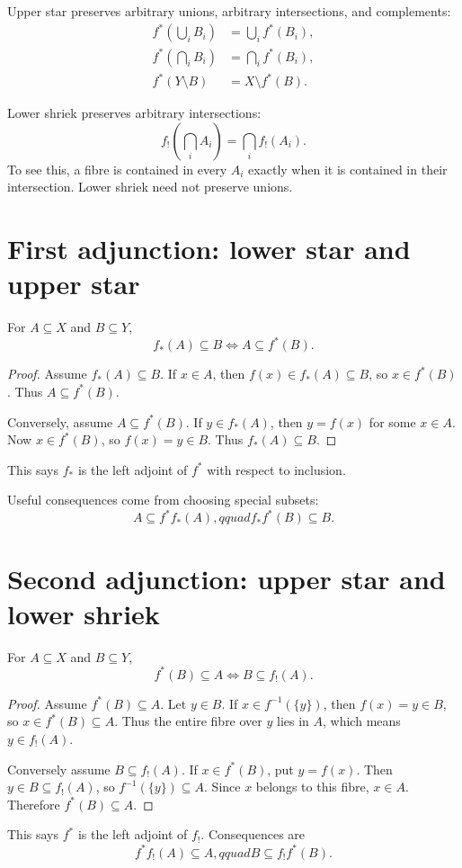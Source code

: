 \documentclass[11pt,openany]{book}
\theoremstyle{definition}
\begin{document}
Upper star preserves arbitrary unions, arbitrary intersections, and complements:
\begin{align*}
f^*\left(\bigcup_iB_i\right)&=\bigcup_i f^*(B_i),\\
f^*\left(\bigcap_iB_i\right)&=\bigcap_i f^*(B_i),\\
f^*(Y\setminus B)&=X\setminus f^*(B).
\end{align*}

Lower shriek preserves arbitrary intersections:
\[
f_!\left(\bigcap_iA_i\right)=\bigcap_i f_!(A_i).
\]
To see this, a fibre is contained in every $A_i$ exactly when it is contained in their intersection. Lower shriek need not preserve unions.

\section{First adjunction: lower star and upper star}
For $A\subseteq X$ and $B\subseteq Y$,
\[
\boxed{f_*(A)\subseteq B\iff A\subseteq f^*(B).} \tag{15.2}
\]
\begin{proof}
Assume $f_*(A)\subseteq B$. If $x\in A$, then $f(x)\in f_*(A)\subseteq B$, so $x\in f^*(B)$. Thus $A\subseteq f^*(B)$.

Conversely, assume $A\subseteq f^*(B)$. If $y\in f_*(A)$, then $y=f(x)$ for some $x\in A$. Now $x\in f^*(B)$, so $f(x)=y\in B$. Thus $f_*(A)\subseteq B$.
\end{proof}
This says $f_*$ is the left adjoint of $f^*$ with respect to inclusion.

Useful consequences come from choosing special subsets:
\[
A\subseteq f^*f_*(A),qquad f_*f^*(B)\subseteq B.
\]

\section{Second adjunction: upper star and lower shriek}
For $A\subseteq X$ and $B\subseteq Y$,
\[
\boxed{f^*(B)\subseteq A\iff B\subseteq f_!(A).} \tag{15.3}
\]
\begin{proof}
Assume $f^*(B)\subseteq A$. Let $y\in B$. If $x\in f^{-1}(\{y\})$, then $f(x)=y\in B$, so $x\in f^*(B)\subseteq A$. Thus the entire fibre over $y$ lies in $A$, which means $y\in f_!(A)$.

Conversely assume $B\subseteq f_!(A)$. If $x\in f^*(B)$, put $y=f(x)$. Then $y\in B\subseteq f_!(A)$, so $f^{-1}(\{y\})\subseteq A$. Since $x$ belongs to this fibre, $x\in A$. Therefore $f^*(B)\subseteq A$.
\end{proof}
This says $f^*$ is the left adjoint of $f_!$. Consequences are
\[
f^*f_!(A)\subseteq A,qquad B\subseteq f_!f^*(B).
\]
\end{document}
